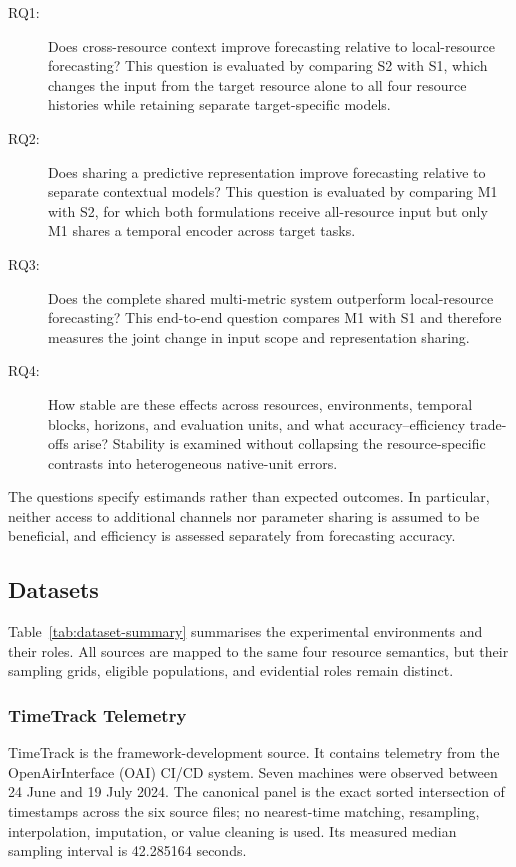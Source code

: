 \documentclass[a4paper,fleqn]{cas-dc}
\begin{document}
\begin{description}
  \item[RQ1:] Does cross-resource context improve forecasting relative to
    local-resource forecasting?  This question is evaluated by comparing S2
    with S1, which changes the input from the target resource alone to all four
    resource histories while retaining separate target-specific models.
  \item[RQ2:] Does sharing a predictive representation improve forecasting
    relative to separate contextual models?  This question is evaluated by
    comparing M1 with S2, for which both formulations receive all-resource
    input but only M1 shares a temporal encoder across target tasks.
  \item[RQ3:] Does the complete shared multi-metric system outperform
    local-resource forecasting?  This end-to-end question compares M1 with S1
    and therefore measures the joint change in input scope and representation
    sharing.
  \item[RQ4:] How stable are these effects across resources, environments,
    temporal blocks, horizons, and evaluation units, and what
    accuracy--efficiency trade-offs arise?  Stability is examined without
    collapsing the resource-specific contrasts into heterogeneous native-unit
    errors.
\end{description}

The questions specify estimands rather than expected outcomes.  In particular,
neither access to additional channels nor parameter sharing is assumed to be
beneficial, and efficiency is assessed separately from forecasting accuracy.

\subsection{Datasets}
\label{sec:datasets}

Table~\ref{tab:dataset-summary} summarises the experimental environments and
their roles.  All sources are mapped to the same four resource semantics, but
their sampling grids, eligible populations, and evidential roles remain
distinct.

\subsubsection{TimeTrack Telemetry}
\label{sec:timetrack-data}

TimeTrack is the framework-development source.  It contains telemetry from the
OpenAirInterface (OAI) CI/CD system.  Seven machines were observed between
24 June and 19 July 2024.  The canonical panel
is the exact sorted intersection of timestamps across the six source files; no
nearest-time matching, resampling, interpolation, imputation, or value cleaning
is used.  Its measured median sampling interval is 42.285164 seconds.
\end{document}
